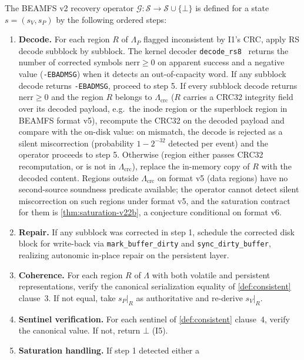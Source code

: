 \begin{definition}\label{def:G}
The BEAMFS v2 recovery operator \(\mathcal{G} : \mathcal{S} \to \mathcal{S} \cup \{\bot\}\)
is defined for a state \(s = (s_V, s_P)\) by the following ordered
steps:
\begin{enumerate}
\item \textbf{Decode.} For each region \(R\) of \(\Lambda_P\)
  flagged inconsistent by I1's CRC, apply RS decode subblock by
  subblock. The kernel decoder
  \texttt{decode\_rs8}~\cite{kernelrslib} returns the number of
  corrected symbols \(\mathrm{nerr} \geq 0\) on apparent success
  and a negative value (\texttt{-EBADMSG}) when it detects an
  out-of-capacity word. If any subblock decode returns
  \texttt{-EBADMSG}, proceed to step 5. If every subblock decode
  returns \(\mathrm{nerr} \geq 0\) and the region \(R\) belongs to
  \(\Lambda_{\mathrm{crc}}\) (\(R\) carries a CRC32 integrity
  field over its decoded payload, e.g.\ the inode region or the
  superblock region in BEAMFS format v5), recompute the CRC32 on
  the decoded payload and compare with the on-disk value: on
  mismatch, the decode is rejected as a silent miscorrection
  (probability \(1 - 2^{-32}\) detected per event) and the
  operator proceeds to step 5. Otherwise (region either passes
  CRC32 recomputation, or is not in \(\Lambda_{\mathrm{crc}}\)),
  replace the in-memory copy of \(R\) with the decoded content.
  Regions outside \(\Lambda_{\mathrm{crc}}\) on format v5 (data
  regions) have no second-source soundness predicate available;
  the operator cannot detect silent miscorrection on such regions
  under format v5, and the saturation contract for them is
  \cref{thm:saturation-v22b}, a conjecture conditional on format
  v6.
\item \textbf{Repair.} If any subblock was corrected in step 1,
  schedule the corrected disk block for write-back via
  \texttt{mark\_buffer\_dirty} and \texttt{sync\_dirty\_buffer},
  realizing autonomic in-place repair on the persistent layer.
\item \textbf{Coherence.} For each region \(R\) of \(\Lambda\)
  with both volatile and persistent representations, verify the
  canonical serialization equality of \cref{def:consistent}
  clause~3. If not equal, take \(s_P|_R\) as authoritative
  and re-derive \(s_V|_R\).
\item \textbf{Sentinel verification.} For each sentinel of
  \cref{def:consistent} clause~4, verify the canonical value. If
  not, return \(\bot\) (I5).
\item \textbf{Saturation handling.} If step 1 detected either a

\end{enumerate}
\end{definition}
